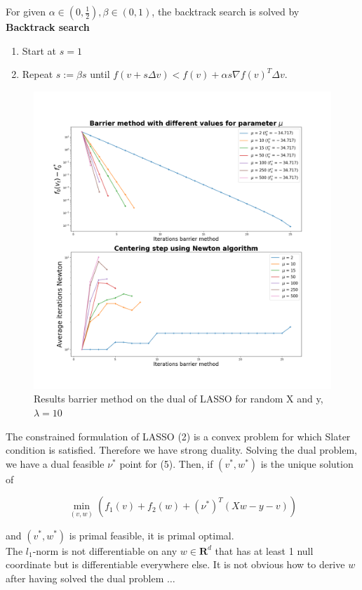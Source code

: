 \documentclass[a4paper, 11pt]{article}
\begin{document}
For given $\alpha \in (0,\frac{1}{2}), \beta \in (0,1)$, the backtrack search is solved by \\

\noindent\textbf{Backtrack search} 
\begin{enumerate}
  \item Start at $s=1$ 
  \item Repeat $s:= \beta s$ until $f(v + s\Delta v) < f(v) + \alpha s \nabla f(v)^T\Delta v$.
\end{enumerate}

\begin{figure}[!h]
  \centering
  \includegraphics[width=16cm]{barr.png}
  \caption{Results barrier method on the dual of LASSO for random X and y, $\lambda=10$}
  \label{fig:barr}
\end{figure}

The constrained formulation of LASSO (2) is a convex problem for which Slater condition is satisfied. Therefore we have
strong duality. Solving the dual problem, we have a dual feasible $\nu^*$ point for (5). Then, if $(v^*, w^*)$ is
the unique solution of

\begin{equation}
  \min_{(v,w)} \left( f_1(v) + f_2(w) + (\nu^*)^T(Xw - y - v) \right) 
\end{equation}

and $(v^*, w^*)$ is primal feasible, it is primal optimal. \\

The $l_1$-norm is not differentiable on any $w \in \mathbf{R}^d$ that has at least 1 null coordinate but is
differentiable everywhere else. It is not obvious how to derive $w$ after having solved the dual problem $\ldots$
\end{document}
